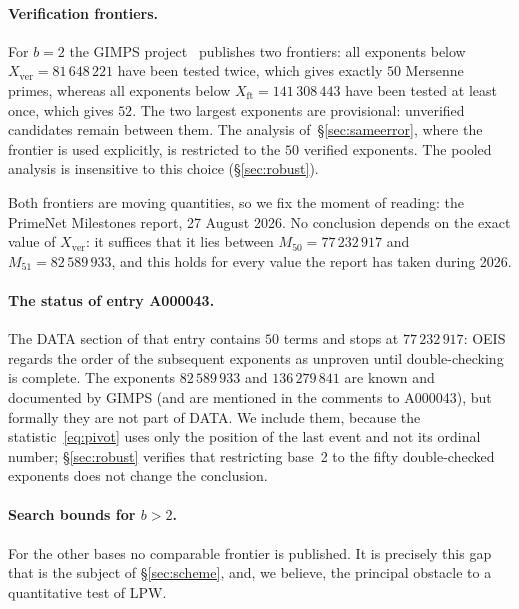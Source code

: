 \documentclass[11pt,a4paper]{article}
\theoremstyle{plain}
\theoremstyle{remark}
\begin{document}
\paragraph{Verification frontiers.} For $b=2$ the GIMPS project~\cite{gimps}
publishes two frontiers: all exponents below $X_{\mathrm{ver}}=81\,648\,221$
have been tested twice, which gives exactly $50$ Mersenne primes, whereas all
exponents below $X_{\mathrm{ft}}=141\,308\,443$ have been tested at least once,
which gives $52$. The two largest exponents are provisional: unverified
candidates remain between them. The analysis of~\S\ref{sec:sameerror}, where the
frontier is used explicitly, is restricted to the $50$ verified exponents. The
pooled analysis is insensitive to this choice (\S\ref{sec:robust}).

Both frontiers are moving quantities, so we fix the moment of reading: the
PrimeNet Milestones report, 27 August 2026. No conclusion depends on the exact
value of $X_{\mathrm{ver}}$: it suffices that it lies between
$M_{50}=77\,232\,917$ and $M_{51}=82\,589\,933$, and this holds for every value
the report has taken during 2026.

\paragraph{The status of entry A000043.} The DATA section of that entry contains
$50$ terms and stops at $77\,232\,917$: OEIS regards the order of the subsequent
exponents as unproven until double-checking is complete. The exponents
$82\,589\,933$ and $136\,279\,841$ are known and documented by GIMPS (and are
mentioned in the comments to A000043), but formally they are not part of DATA.
We include them, because the statistic~\eqref{eq:pivot} uses only the position of
the last event and not its ordinal number; \S\ref{sec:robust} verifies that
restricting base~2 to the fifty double-checked exponents does not change the
conclusion.

\paragraph{Search bounds for $b>2$.} For the other bases no comparable frontier
is published. It is precisely this gap that is the subject of
\S\ref{sec:scheme}, and, we believe, the principal obstacle to a quantitative
test of LPW.
\end{document}
